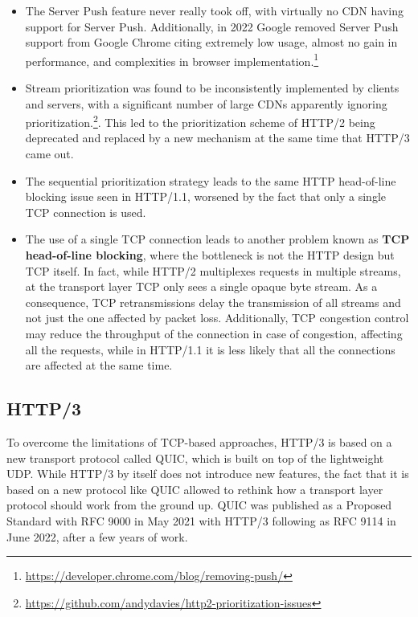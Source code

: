 \begin{itemize}
    \item The Server Push feature never really took off, with virtually no CDN having support for Server Push. Additionally, in 2022 Google removed Server Push support from Google Chrome citing extremely low usage, almost no gain in performance, and complexities in browser implementation.\footnote{\url{https://developer.chrome.com/blog/removing-push/}}
    \item Stream prioritization was found to be inconsistently implemented by clients and servers, with a significant number of large CDNs apparently ignoring prioritization.\footnote{\url{https://github.com/andydavies/http2-prioritization-issues}}. This led to the prioritization scheme of HTTP/2 being deprecated and replaced by a new mechanism at the same time that HTTP/3 came out.
    \item The sequential prioritization strategy leads to the same HTTP head-of-line blocking issue seen in HTTP/1.1, worsened by the fact that only a single TCP connection is used.
    \item The use of a single TCP connection leads to another problem known as \textbf{TCP head-of-line blocking}, where the bottleneck is not the HTTP design but TCP itself. In fact, while HTTP/2 multiplexes requests in multiple streams, at the transport layer TCP only sees a single opaque byte stream. As a consequence, TCP retransmissions delay the transmission of all streams and not just the one affected by packet loss. Additionally, TCP congestion control may reduce the throughput of the connection in case of congestion, affecting all the requests, while in HTTP/1.1 it is less likely that all the connections are affected at the same time.
\end{itemize}

\subsection{HTTP/3}
\label{sec:bg/http3}

To overcome the limitations of TCP-based approaches, HTTP/3 is based on a new transport protocol called QUIC, which is built on top of the lightweight UDP. While HTTP/3 by itself does not introduce new features, the fact that it is based on a new protocol like QUIC allowed to rethink how a transport layer protocol should work from the ground up. QUIC was published as a Proposed Standard with RFC 9000 in May 2021 with HTTP/3 following as RFC 9114 in June 2022, after a few years of work.\cite{http3}

